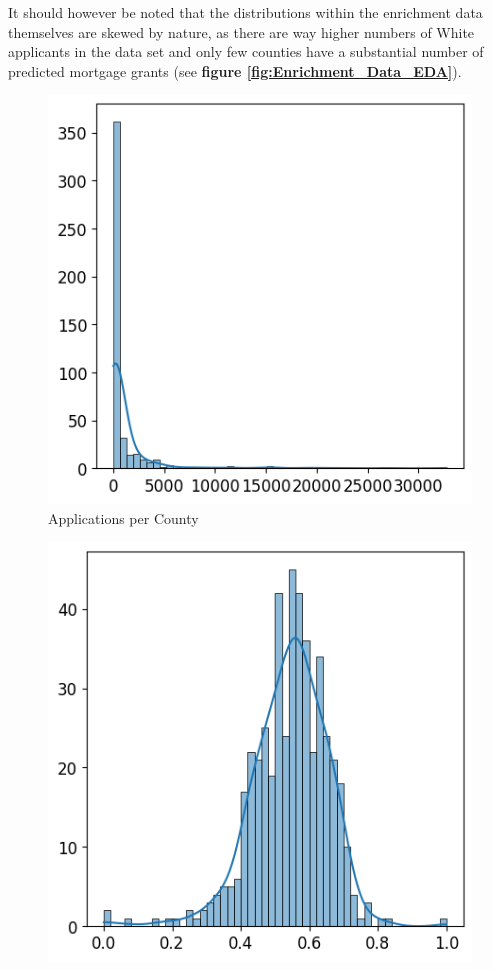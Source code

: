 It should however be noted that the distributions within the enrichment data themselves are skewed by nature, as there are way higher numbers of White applicants in the data set and only few counties have a substantial number of predicted mortgage grants (see \textbf{figure \ref{fig:Enrichment_Data_EDA}}).

\begin{figure}[!htbp]
    \centering
    \begin{minipage}{0.33\textwidth}
        \centering
        \includegraphics[width=\textwidth]{images/geo_enrich/predictions_per_county.png}
        \small
        Applications per County
    \end{minipage}\hfill
    \begin{minipage}{0.33\textwidth}
        \centering
        \includegraphics[width=\textwidth]{images/geo_enrich/perc_predictions.png}

\end{minipage}
\end{figure}
